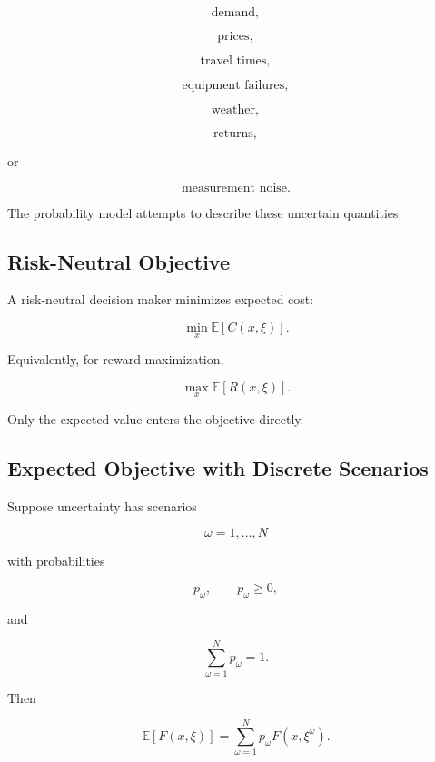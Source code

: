 \[
\boxed{
\text{demand},
}
\]

\[
\boxed{
\text{prices},
}
\]

\[
\boxed{
\text{travel times},
}
\]

\[
\boxed{
\text{equipment failures},
}
\]

\[
\boxed{
\text{weather},
}
\]

\[
\boxed{
\text{returns},
}
\]

or

\[
\boxed{
\text{measurement noise}.
}
\]

The probability model attempts to describe these uncertain quantities.

\subsection{Risk-Neutral Objective}
\label{subsec:risk-neutral-objective}

A risk-neutral decision maker minimizes expected cost:

\[
\boxed{
\min_x
\mathbb{E}
[
C(x,\xi)
].
}
\]

Equivalently, for reward maximization,

\[
\boxed{
\max_x
\mathbb{E}
[
R(x,\xi)
].
}
\]

Only the expected value enters the objective directly.

\subsection{Expected Objective with Discrete Scenarios}
\label{subsec:expected-objective-discrete-scenarios}

Suppose uncertainty has scenarios

\[
\omega=1,\ldots,N
\]

with probabilities

\[
p_\omega,
\qquad
p_\omega\geq0,
\]

and

\[
\sum_{\omega=1}^{N}
p_\omega=1.
\]

Then

\[
\boxed{
\mathbb{E}
[
F(x,\xi)
]
=
\sum_{\omega=1}^{N}
p_\omega
F(x,\xi^\omega).
}
\]

